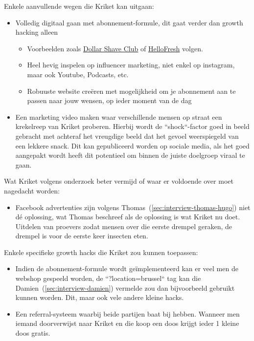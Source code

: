 Enkele aanvullende wegen die Kriket kan uitgaan:
\begin{itemize}
	\item Volledig digitaal gaan met abonnement-formule, dit gaat verder dan growth hacking alleen
	\begin{itemize}
		\item Voorbeelden zoals \href{https://www.dollarshaveclub.com/}{Dollar Shave Club} of \href{https://www.hellofresh.be/}{HelloFresh} volgen.
		\item Heel hevig inspelen op influencer marketing, niet enkel op instagram, maar ook Youtube, Podcasts, etc.
		\item Robuuste website creëren met mogelijkheid om je abonnement aan te passen naar jouw wensen, op ieder moment van de dag
	\end{itemize}
	\item Een marketing video maken waar verschillende mensen op straat een krekelreep van Kriket proberen. Hierbij wordt de ``shock``-factor goed in beeld gebracht met achteraf het vreugdige beeld dat het gevoel weerspiegeld van een lekkere snack. Dit kan gepubliceerd worden op sociale media, als het goed aangepakt wordt heeft dit potentieel om binnen de juiste doelgroep viraal te gaan.
\end{itemize}

Wat Kriket volgens onderzoek beter vermijd of waar er voldoende over moet nagedacht worden:
\begin{itemize}
	\item Facebook advertenties zijn volgens Thomas~(\ref{sec:interview-thomas-hugo}) niet dé oplossing, wat Thomas beschreef als de oplossing is wat Kriket nu doet. Uitdelen van proevers zodat mensen over die eerste drempel geraken, de drempel is voor de eerste keer insecten eten.
\end{itemize}

Enkele specifieke growth hacks die Kriket zou kunnen toepassen:
\begin{itemize}
	\item Indien de abonnement-formule wordt geïmplementeerd kan er veel men de webshop gespeeld worden, de ``?location=brussel`` tag kan die Damien~(\ref{sec:interview-damien}) vermelde zou dan bijvoorbeeld gebruikt kunnen worden. Dit, maar ook vele andere kleine hacks.
	\item Een referral-systeem waarbij beide partijen baat bij hebben. Wanneer men iemand doorverwijst naar Kriket en die koop een doos krijgt ieder 1 kleine doos gratis.
\end{itemize}

